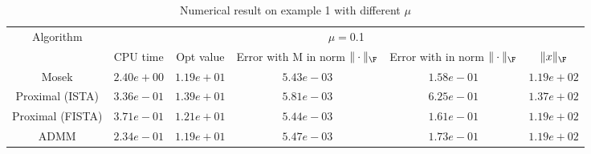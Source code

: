 \begin{table}
\centering
\begin{tabular}{|c|c|c|c|c|c|}

\hline
\multirow{2}{*}{ Algorithm} &\multicolumn{5}{c|}{$\mu=$0.1}\\\cline{2-6}
 &CPU time &Opt value &Error with M in norm $\|\cdot\|_\F$ &Error with in norm $\|\cdot\|_\F$ &$\|x\|_\F$\\\hline
Mosek & $2.40e+00$ & $1.19e+01$ & $5.43e-03$ & $1.58e-01$ & $1.19e+02$\\\hline
Proximal (ISTA) & $3.36e-01$ & $1.39e+01$ & $5.81e-03$ & $6.25e-01$ & $1.37e+02$\\\hline
Proximal (FISTA) & $3.71e-01$ & $1.21e+01$ & $5.44e-03$ & $1.61e-01$ & $1.19e+02$\\\hline
ADMM & $2.34e-01$ & $1.19e+01$ & $5.47e-03$ & $1.73e-01$ & $1.19e+02$\\\hline
\end{tabular}
\caption{Numerical result on example 1 with different $\mu$\label{example1}}
\end{table}
